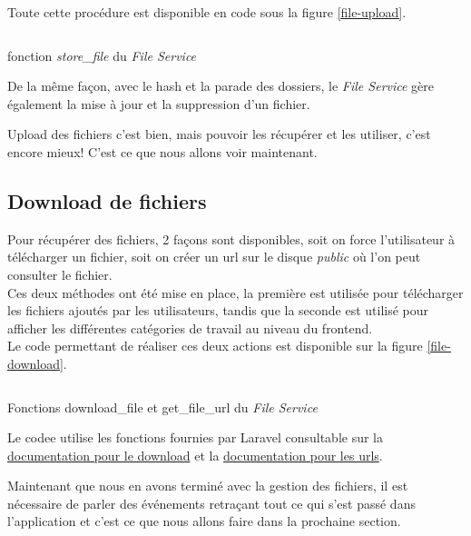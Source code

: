 \documentclass[
    iai, %
    il, %
]{heig-tb}
\begin{document}
Toute cette procédure est disponible en code sous la figure \ref{file-upload}.

\begin{listing}[h]
    \inputminted{php}{assets/code/FileUpload.php}
    \caption{fonction \emph{store\_file} du \emph{File Service} \label{file-upload}}
\end{listing}

De la même façon, avec le hash et la parade des dossiers, le \emph{File Service} gère également la mise à jour et la suppression d'un fichier.

Upload des fichiers c'est bien, mais pouvoir les récupérer et les utiliser, c'est encore mieux!
C'est ce que nous allons voir maintenant.

\subsection{Download de fichiers}
Pour récupérer des fichiers, 2 façons sont disponibles, soit on force l'utilisateur à télécharger un fichier, soit on créer un \Gls{url} sur le disque \emph{public} où l'on peut consulter le fichier. \\
Ces deux méthodes ont été mise en place, la première est utilisée pour télécharger les fichiers ajoutés par les utilisateurs, tandis que la seconde est utilisé pour afficher les différentes catégories de travail au niveau du \Gls{frontend}. \\
Le code permettant de réaliser ces deux actions est disponible sur la figure \ref{file-download}.

\begin{listing}[h]
    \inputminted{php}{assets/code/FileDownload.php}
    \caption{Fonctions download\_file et get\_file\_url du \emph{File Service} \label{file-download}}
\end{listing}

Le codee utilise les fonctions fournies par Laravel consultable sur la \href{https://laravel.com/docs/9.x/filesystem#downloading-files}{documentation pour le download} et la \href{https://laravel.com/docs/9.x/filesystem#file-urls}{documentation pour les urls}.

Maintenant que nous en avons terminé avec la gestion des fichiers, il est nécessaire de parler des événements retraçant tout ce qui s'est passé dans l'application et c'est ce que nous allons faire dans la prochaine section.
\end{document}
